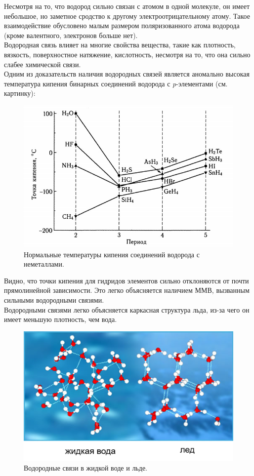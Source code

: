 Несмотря на то, что водород сильно связан с атомом в одной молекуле, он имеет небольшое, но заметное сродство к другому электроотрицательному атому. Такое взаимодействие обусловено малым размером поляризованного атома водорода (кроме валентного, электронов больше нет).\\

Водородная связь влияет на многие свойства вещества, такие как плотность, вязкость, поверхностное натяжение, кислотность, несмотря на то, что она сильно слабее химической связи.\\

Одним из доказательств наличия водородных связей является аномально высокая температура кипения бинарных соединений водорода с \textit{p}-элементами (см. картинку):

\begin{figure}[H]
	\centering
	\includegraphics[width=0.7\linewidth]{Pictures/Temp.jpg}
	\caption{Нормальные температуры кипения соединений водорода с неметаллами.}
\end{figure}

Видно, что точки кипения для гидридов элементов  сильно отклоняются от почти прямолинейной зависимости. Это легко объясняется наличием ММВ, вызванным сильными водородными связями.\\

Водородными связями легко объясняется каркасная структура льда, из-за чего он имеет меньшую плотность, чем вода.

\begin{figure}[H]
	\centering
	\includegraphics[width=0.7\linewidth]{Pictures/Led.png}
	\caption{Водородные связи в жидкой воде и льде.}
\end{figure}
